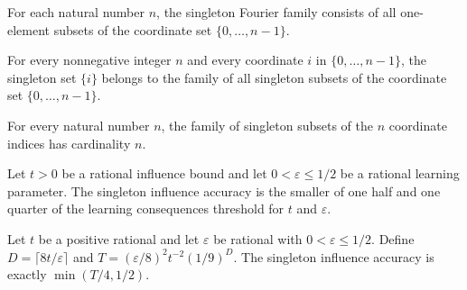 \begin{definition}
\label{FABL.singletonFourierFamily}
\leanok
For each natural number $n$, the singleton Fourier family consists of all one-element
subsets of the coordinate set $\{0,\ldots,n-1\}$.
\end{definition}

\begin{theorem}
\label{FABL.singleton_mem_singletonFourierFamily}
\leanok
{}
For every nonnegative integer $n$ and every coordinate $i$ in $\{0,\dots,n-1\}$, the
singleton set $\{i\}$ belongs to the family of all singleton subsets of the coordinate
set $\{0,\dots,n-1\}$.
\end{theorem}

\begin{theorem}
\label{FABL.card_singletonFourierFamily}
\leanok
{}
For every natural number $n$, the family of singleton subsets of the $n$ coordinate
indices has cardinality $n$.
\end{theorem}

\begin{definition}
\label{FABL.singletonInfluenceAccuracy}
\leanok
{}
Let $t>0$ be a rational influence bound and let $0<\varepsilon\leq 1/2$ be a rational
learning parameter. The singleton influence accuracy is the smaller of one half and one
quarter of the learning consequences threshold for $t$ and $\varepsilon$.
\end{definition}

\begin{theorem}
\label{FABL.singletonInfluenceAccuracy_value}
\leanok
{}
Let $t$ be a positive rational and let $\varepsilon$ be rational with $0<\varepsilon\le
1/2$. Define $D=\lceil 8t/\varepsilon\rceil$ and $T=(\varepsilon/8)^2t^{-2}(1/9)^D$. The
singleton influence accuracy is exactly $\min(T/4,1/2)$.
\end{theorem}

